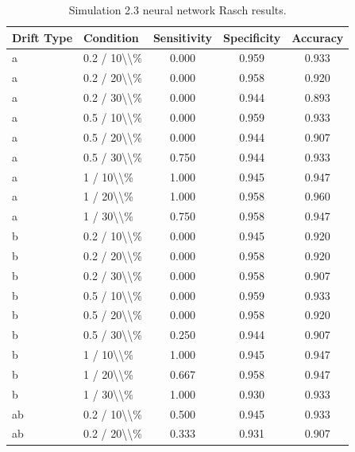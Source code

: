 \begin{table}[!h]
\centering
\caption{\label{tab:tab:sim23_nn_rasch}Simulation 2.3 neural network Rasch results.}
\centering
\begin{tabular}[t]{llccc}
\toprule
Drift Type & Condition & Sensitivity & Specificity & Accuracy\\
\midrule
a & 0.2 / 10\textbackslash{}\textbackslash{}\% & 0.000 & 0.959 & 0.933\\
a & 0.2 / 20\textbackslash{}\textbackslash{}\% & 0.000 & 0.958 & 0.920\\
a & 0.2 / 30\textbackslash{}\textbackslash{}\% & 0.000 & 0.944 & 0.893\\
a & 0.5 / 10\textbackslash{}\textbackslash{}\% & 0.000 & 0.959 & 0.933\\
a & 0.5 / 20\textbackslash{}\textbackslash{}\% & 0.000 & 0.944 & 0.907\\
\addlinespace
a & 0.5 / 30\textbackslash{}\textbackslash{}\% & 0.750 & 0.944 & 0.933\\
a & 1 / 10\textbackslash{}\textbackslash{}\% & 1.000 & 0.945 & 0.947\\
a & 1 / 20\textbackslash{}\textbackslash{}\% & 1.000 & 0.958 & 0.960\\
a & 1 / 30\textbackslash{}\textbackslash{}\% & 0.750 & 0.958 & 0.947\\
b & 0.2 / 10\textbackslash{}\textbackslash{}\% & 0.000 & 0.945 & 0.920\\
\addlinespace
b & 0.2 / 20\textbackslash{}\textbackslash{}\% & 0.000 & 0.958 & 0.920\\
b & 0.2 / 30\textbackslash{}\textbackslash{}\% & 0.000 & 0.958 & 0.907\\
b & 0.5 / 10\textbackslash{}\textbackslash{}\% & 0.000 & 0.959 & 0.933\\
b & 0.5 / 20\textbackslash{}\textbackslash{}\% & 0.000 & 0.958 & 0.920\\
b & 0.5 / 30\textbackslash{}\textbackslash{}\% & 0.250 & 0.944 & 0.907\\
\addlinespace
b & 1 / 10\textbackslash{}\textbackslash{}\% & 1.000 & 0.945 & 0.947\\
b & 1 / 20\textbackslash{}\textbackslash{}\% & 0.667 & 0.958 & 0.947\\
b & 1 / 30\textbackslash{}\textbackslash{}\% & 1.000 & 0.930 & 0.933\\
ab & 0.2 / 10\textbackslash{}\textbackslash{}\% & 0.500 & 0.945 & 0.933\\
ab & 0.2 / 20\textbackslash{}\textbackslash{}\% & 0.333 & 0.931 & 0.907\\

\end{tabular}
\end{table}
